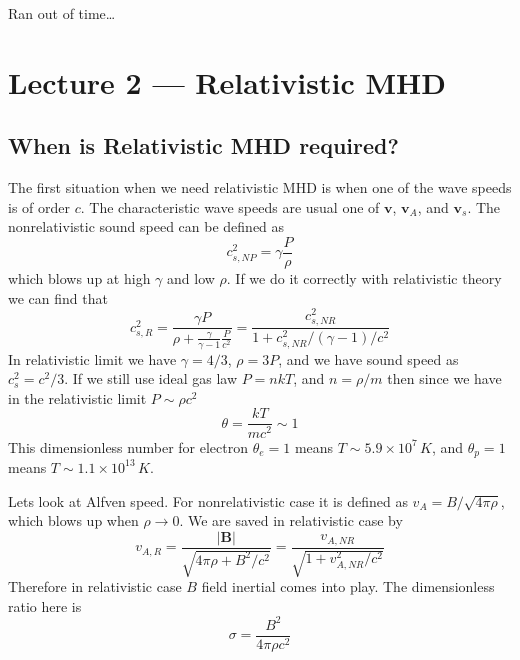 \documentclass[letterpaper, 11pt]{article}
\numberwithin{equation}{section}
\numberwithin{figure}{section}
\begin{document}
Ran out of time\dots

\section{Lecture 2 --- Relativistic MHD}

\subsection{When is Relativistic MHD required?}

The first situation when we need relativistic MHD is when one of the wave speeds
is of order $c$. The characteristic wave speeds are usual one of $\mathbf{v}$,
$\mathbf{v}_A$, and $\mathbf{v}_{s}$. The nonrelativistic sound speed can be
defined as
\begin{equation}
  \label{eq:16}
  c_{s,NP}^2 = \gamma\frac{P}{\rho}
\end{equation}
which blows up at high $\gamma$ and low $\rho$. If we do it correctly with
relativistic theory we can find that
\begin{equation}
  \label{eq:17}
  c_{s,R}^2 = \frac{\gamma P}{\rho + \frac{\gamma}{\gamma - 1}\frac{P}{c^2}} = \frac{c_{s,NR}^2}{1 + c_{s,NR}^2/(\gamma - 1)/c^2}
\end{equation}
In relativistic limit we have $\gamma = 4/3$, $\rho = 3P$, and we have sound
speed as $c_s^2 = c^2/3$. If we still use ideal gas law $P = nkT$, and $n = \rho
/ m$ then since we have in the relativistic limit $P \sim \rho c^2$
\begin{equation}
  \label{eq:18}
  \theta = \frac{kT}{mc^2} \sim 1
\end{equation}
This dimensionless number for electron $\theta_{e} = 1$ means $T \sim 5.9\times
10^7\,K$, and $\theta_p = 1$ means $T \sim 1.1 \times 10^{13}\,K$.

Lets look at Alfven speed. For nonrelativistic case it is defined as $v_A =
B/\sqrt{4\pi\rho}$, which blows up when $\rho \to 0$. We are saved in
relativistic case by
\begin{equation}
  \label{eq:19}
  v_{A, R} = \frac{\left| \mathbf{B} \right|}{\sqrt{4\pi\rho + B^2/c^2}}  = \frac{v_{A,NR}}{\sqrt{1 + v_{A,NR}^2/c^2}}
\end{equation}
Therefore in relativistic case $B$ field inertial comes into play. The
dimensionless ratio here is
\begin{equation}
  \label{eq:20}
  \sigma = \frac{B^2}{4\pi\rho c^2}
\end{equation}
\end{document}

